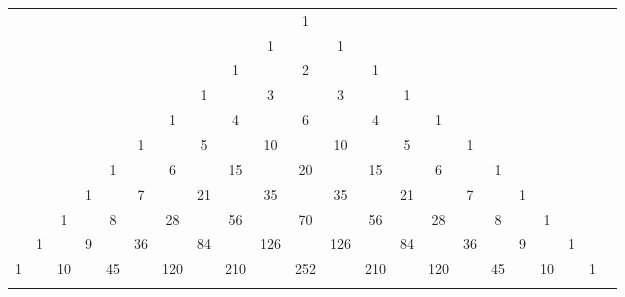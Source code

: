 {\color{gray!50}
\begin{tabular}{rccccccccccccccccccccc}
   &    &    &    &    &    &    &    &    &    &  1\\\noalign{\smallskip\smallskip}
   &    &    &    &    &    &    &    &    &  1 &    &  1\\\noalign{\smallskip\smallskip}
   &    &    &    &    &    &    &    &  1 &    &  2 &    &  {\color{black}1}\\\noalign{\smallskip\smallskip}
   &    &    &    &    &    &    &  1 &    &  3 &    &  {\color{black}3} &    &  1\\\noalign{\smallskip\smallskip}
   &    &    &    &    &    &  1 &    &  4 &    &  {\color{black}6} &    &  4 &    &  1\\\noalign{\smallskip\smallskip}
   &    &    &    &    &  1 &    &  5 &    & {\color{black}10} &    & 10 &    &  5 &    &  1\\\noalign{\smallskip\smallskip}
   &    &    &    &  1 &    &  6 &    & {\color{black}15} &    & 20 &    & 15 &    &  6 &    &  1\\\noalign{\smallskip\smallskip}
   &    &    &  1 &    &  7 &    & 21 &    & {\color{black}35} &    & 35 &    & 21 &    &  7 &    &  1\\\noalign{\smallskip\smallskip}
   &    &  1 &    &  8 &    & 28 &    & 56 &    & 70 &    & 56 &    & 28 &    &  8 &    &  1\\\noalign{\smallskip\smallskip}
   &  1 &    &  9 &    & 36 &    & 84 &    & 126 &    & 126 &    & 84 &    & 36 &    &  9 &    &  1\\\noalign{\smallskip\smallskip}
 1 &    & 10 &    & 45 &    & 120 &    & 210 &    & 252 &    & 210 &    & 120 &    & 45 &    & 10 &    &  1\\\noalign{\smallskip\smallskip}
\end{tabular}
}

